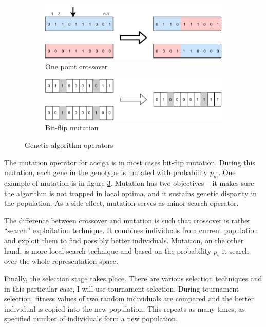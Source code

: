 \begin{figure}
    \begin{subfigure}[b]{0.4\textwidth}
        \includegraphics[width=\textwidth]{img/master_onepointcrossover.pdf}
        \caption{One point crossover}
        \label{fig:gaonepointcrossover}
    \end{subfigure}
    \hfill
    \begin{subfigure}[b]{0.4\textwidth}
        \includegraphics[width=\textwidth]{img/master_bitflipmutation.pdf}
        \caption{Bit-flip mutation}
        \label{fig:bitflipmutation}
    \end{subfigure}
    \caption{Genetic algorithm operators}
\end{figure}

The mutation operator for \acrshort{acc:ga} is in most cases bit-flip mutation. During this mutation, each gene in the genotype is mutated with probability $p_m$. One example of mutation is in figure \ref{fig:bitflipmutation}. Mutation has two objectives -- it makes sure the algorithm is not trapped in local optima, and it sustains genetic disparity in the population. As a side effect, mutation serves as minor search operator\citep{IntroToGA}.

The difference between crossover and mutation is such that crossover is rather \enquote{search} exploitation technique. It combines individuals from current population and exploit them to find possibly better individuals. Mutation, on the other hand, is more local search technique and based on the probability $p_b$ it search over the whole representation space.

Finally, the selection stage takes place. There are various selection techniques and in this particular case, I will use tournament selection. During tournament selection, fitness values of two random individuals are compared and the better individual is copied into the new population. This repeats as many times, as specified number of individuals form a new population.

